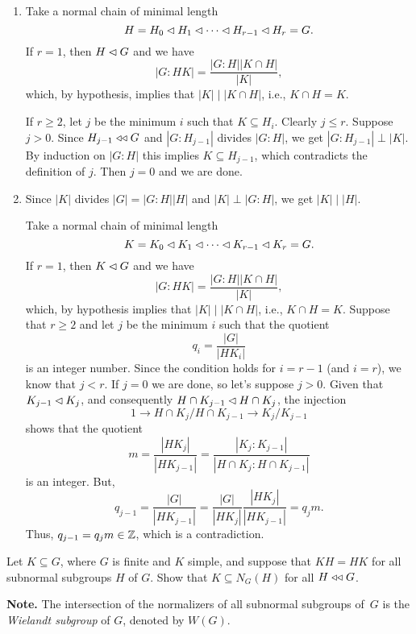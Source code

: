 \begin{solution} 

\begin{enumerate}[\rm a)]
    \item Take a normal chain of minimal length
    $$
        H=H_0\lhd H_1\lhd\cdots\lhd H_{r-1}\lhd H_r=G.
    $$
    If $r=1$, then $H\lhd G$ and we have
    $$
        |G:HK| = \frac{|G:H||K\cap H|}{|K|},
    $$
    which, by hypothesis, implies that $|K|\mid|K\cap H|$, i.e., $K\cap H=K$.

    If $r\ge 2$, let $j$ be the minimum $i$ such that $K\subseteq H_i$. Clearly $j\le r$. Suppose $j>0$. Since $H_{j-1}\mathrel{\triangleleft\triangleleft} G$ and $|G:H_{j-1}|$ divides $|G:H|$, we get $|G:H_{j-1}|\perp|K|$. By induction on $|G:H|$ this implies $K\subseteq H_{j-1}$, which contradicts the definition of $j$. Then $j=0$ and we are done.

    \item Since $|K|$ divides $|G|=|G : H||H|$ and $|K|\perp|G:H|$, we get $|K|\mid|H|$.

    Take a normal chain of minimal length
    $$
        K=K_0\lhd K_1\lhd\cdots\lhd K_{r-1}\lhd K_r=G.
    $$
    If $r=1$, then $K\lhd G$ and we have
    $$
        |G:HK| = \frac{|G:H||K\cap H|}{|K|},
    $$
    which, by hypothesis implies that $|K|\mid|K\cap H|$, i.e., $K\cap H=K$. Suppose that $r\ge2$ and let $j$ be the minimum $i$ such that the quotient
    $$
        q_i=\frac{|G|}{|HK_i|}
    $$
    is an integer number. Since the condition holds for $i=r-1$ (and $i=r$), we know that $j<r$. If $j=0$ we are done, so let's suppose $j>0$. Given that $K_{j-1}\lhd K_j$, and consequently $H\cap K_{j-1}\lhd H\cap K_j$, the injection
    $$
        1\to H\cap K_j/H\cap K_{j-1}\to K_j/K_{j-1} 
    $$
    shows that the quotient
    $$
        m=\frac{|HK_j|}{|HK_{j-1}|}=\frac{|K_j:K_{j-1}|}{|H\cap K_j:H\cap K_{j-1}|}
    $$
    is an integer. But,
    $$
        q_{j-1}=\frac{|G|}{|HK_{j-1}|} = \frac{|G|}{|HK_j|}\frac{|HK_j|}{|HK_{j-1}|}
            =q_jm.
    $$
    Thus, $q_{j-1}=q_jm\in\mathbb{Z}$, which is a contradiction.
\end{enumerate}
\end{solution}

\begin{probl}
    Let\/ $K \subseteq G$, where\/ $G$ is finite and\/ $K$ simple, and suppose that\/ $KH=HK$ for all subnormal subgroups\/ $H$ of\/ $G$. Show that\/ $K \subseteq N_G(H)$ for all\/ $H \mathrel{\triangleleft\triangleleft} G$.

    \textrm{\rm\textbf{Note.} The intersection of the normalizers of all subnormal subgroups of\/~$G$ is the \textsl{Wielandt subgroup\/} of $G$, denoted by $W(G)$.}
\end{probl}

